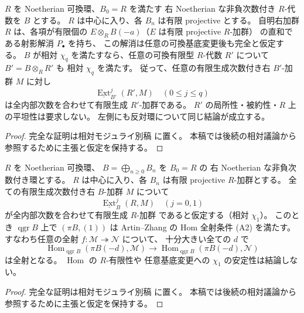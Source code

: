 \begin{lemma}
\label{lem:chi-finite-type-basechange}
$R$ を Noetherian 可換環、$B_0=R$ を満たす
右 Noetherian な非負次数付き $R$-代数を $B$ とする。
$R$ は中心に入り、各 $B_n$ は有限 projective とする。
自明右加群 $R$ は、各項が有限個の
$E\otimes_R B(-a)$（$E$ は有限 projective $R$-加群）
の直和である射影解消 $P_\bullet$ を持ち、
この解消は任意の可換基底変更後も完全と仮定する。
$B$ が相対 $\chi_q$ を満たすなら、任意の可換有限型
$R$-代数 $R'$ について $B'=B\otimes_RR'$ も
相対 $\chi_q$ を満たす。
従って、任意の有限生成次数付き右 $B'$-加群 $M$ に対し
\[
 \underline{\operatorname{Ext}}_{B'}^j(R',M)
 \quad(0\le j\le q)
\]
は全内部次数を合わせて有限生成 $R'$-加群である。
$R'$ の局所性・被約性・$R$ 上の平坦性は要求しない。
左側にも反対環について同じ結論が成立する。
\end{lemma}
\begin{proof}
完全な証明は相対モジュライ別稿
\cite[相対Koszul・Noetherian基底変更・tailsの節]{QuadricModuli2026} に置く。
本稿では後続の相対議論から参照するために主張と仮定を保持する。
\end{proof}

\begin{lemma}
\label{lem:relative-chi1-implies-AZ-A2}
$R$ を Noetherian 可換環、
$B=\bigoplus_{n\ge0}B_n$ を $B_0=R$ の
右 Noetherian な非負次数付き環とする。
$R$ は中心に入り、各 $B_n$ は有限 projective $R$-加群とする。
全ての有限生成次数付き右 $B$-加群 $M$ について
\[
 \underline{\operatorname{Ext}}_B^j(R,M)
 \quad(j=0,1)
\]
が全内部次数を合わせて有限生成 $R$-加群
であると仮定する（相対 $\chi_1$）。
このとき $\operatorname{qgr}B$ 上で
$(\pi B,(1))$ は Artin--Zhang の
Hom 全射条件 (A2) を満たす。
すなわち任意の全射
$f:\mathcal M\twoheadrightarrow\mathcal N$ について、
十分大きい全ての $d$ で
\[
 \operatorname{Hom}_{\operatorname{qgr}B}
       (\pi B(-d),\mathcal M)
 \longrightarrow
 \operatorname{Hom}_{\operatorname{qgr}B}
       (\pi B(-d),\mathcal N)
\]
は全射となる。
$\operatorname{Hom}$ の $R$-有限性や
任意基底変更への $\chi_1$ の安定性は結論しない。
\end{lemma}
\begin{proof}
完全な証明は相対モジュライ別稿
\cite[相対Koszul・Noetherian基底変更・tailsの節]{QuadricModuli2026} に置く。
本稿では後続の相対議論から参照するために主張と仮定を保持する。
\end{proof}

